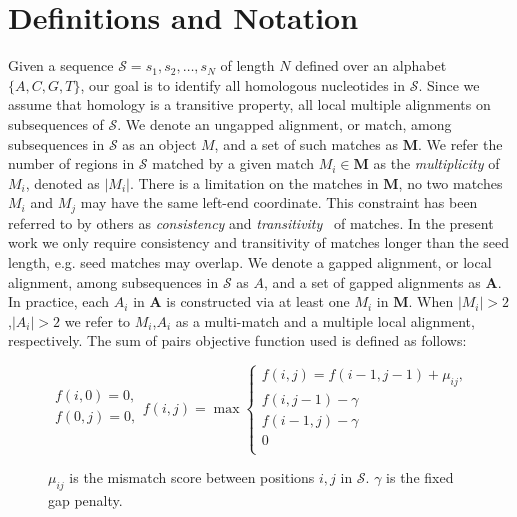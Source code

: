 \documentclass{ws-procs9x6}
\begin{document}
\label{sec:overview}
\section{Definitions and Notation}

Given a sequence $\mathcal{S}=s_1, s_2,\dots, s_N$ of length $N$
defined over an alphabet $\{A,C,G,T\}$, our goal is to identify all homologous nucleotides in $\mathcal{S}$.
Since we assume that homology is a transitive property, all
local multiple alignments on subsequences of $\mathcal{S}$. We denote
an ungapped alignment, or match, among subsequences in $\mathcal{S}$
as an object $M$, and a set of such matches as $\mathbf{M}$.
We refer the number of regions in $\mathcal{S}$
matched by a given match $M_i \in \mathbf{M}$ as the
\textit{multiplicity} of $M_i$, denoted as $|M_i|$. There is a limitation on the matches in
$\mathbf{M}$, no two matches $M_i$ and $M_j$ may have the same
left-end coordinate.  This constraint has been referred to by others as \textit{consistency} and
\textit{transitivity}~\cite{ref-transitivity} of matches.  In the
present work we only require consistency and transitivity of matches
longer than the seed length, e.g. seed matches may overlap. We denote a gapped alignment, or local alignment, among subsequences in $\mathcal{S}$ as $A$, and a set of gapped alignments as $\mathbf{A}$.  In practice, each $A_i$ in $\mathbf{A}$ is constructed via
at least one $M_i$ in $\mathbf{M}$. When $|M_i|>2$,$|A_i|>2$ we refer to $M_i$,$A_i$ as
a multi-match and a multiple local alignment, respectively. The sum of pairs objective function used is defined as follows:\\
\begin{figure}[h!]
$$
\begin{array}{l}
f(i,0) = 0,\\
f(0,j) = 0,\\
\end{array}
f(i,j)= \max\left\{\begin{array}{l}
f(i,j) = f(i-1,j-1)+\mu_{ij},\\
f(i,j-1) - \gamma\\
f(i-1,j)-\gamma\\
0 \\
\end{array}\right.
$$
\begin{center}
$\mu_{ij}$ is the mismatch score between positions $i,j$ in $\mathcal{S}$.  $\gamma$ is the fixed gap penalty.

\end{center}

\label{ref-sop}
\end{figure}
\end{document}
